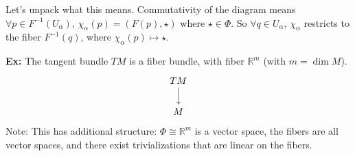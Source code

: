 \documentclass[10pt,letterpaper]{article}
\newcommand{\n}{\hfill\break}
\newcommand{\hangblock}[2]{\par\noindent\settowidth{\hangindent}{\textbf{#1: }}\textbf{#1: }\!\!\!#2}
\newcommand{\ex}[1]{\hangblock{Ex}{#1}}
\newcommand{\reals}{\mathbb{R}}
\newcommand{\R}{\reals}
\newcommand{\inv}{^{-1}}
\begin{document}
\par\noindent
Let's unpack what this means. Commutativity of the diagram means $\forall{}p\in{}F\inv(U_{\alpha})$, $\chi_{\alpha}(p)=(F(p),\star)$ where $\star\in\Phi$. So $\forall{}q\in{}U_{\alpha}$, $\chi_{\alpha}$ restricts to the fiber $F\inv(q)$, where $\chi_{\alpha}(p)\mapsto\star$.\n

\ex{
	The tangent bundle $TM$ is a fiber bundle, with fiber $\R^{m}$ (with $m=\dim{}M$).
	\[
		\begin{tikzcd}[ampersand replacement=\&]
			TM \arrow[d]\\
			M
		\end{tikzcd}
	\]
	Note: This has additional structure: $\Phi\cong\R^{m}$ is a vector space, the fibers are all vector spaces, and there exist trivializations that are linear on the fibers.\n
}
\end{document}
